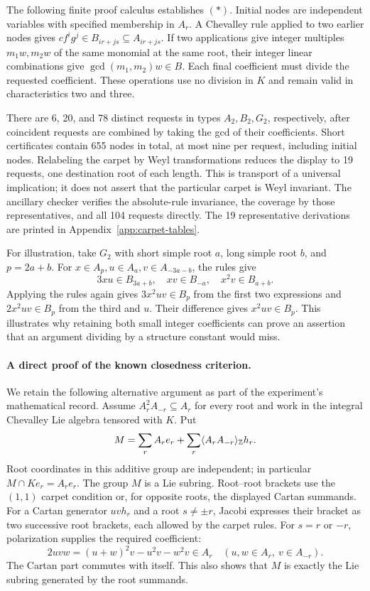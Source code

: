 The following finite proof calculus establishes \((\ast)\).
Initial nodes are independent variables with specified membership
in \(A_r\). A Chevalley rule applied to two earlier nodes gives
\(c f^i g^j\in B_{ir+js}\subseteq A_{ir+js}\).
If two applications give integer multiples \(m_1w,m_2w\) of the
same monomial at the same root, their integer linear combinations
give \(\gcd(m_1,m_2)w\in B\). Each final coefficient must divide
the requested coefficient. These operations use no division in \(K\)
and remain valid in characteristics two and three.

There are 6, 20, and 78 distinct requests in types \(A_2,B_2,G_2\),
respectively, after coincident requests are combined by taking the
gcd of their coefficients. Short certificates contain 655 nodes in
total, at most nine per request, including initial nodes. Relabeling
the carpet by Weyl transformations reduces the display to 19 requests,
one destination root of each length. This is transport of a universal
implication; it does not assert that the particular carpet is Weyl
invariant. The ancillary checker verifies the absolute-rule invariance,
the coverage by those representatives, and all 104 requests directly.
The 19 representative derivations are printed in
Appendix~\ref{app:carpet-tables}.

For illustration, take \(G_2\) with short simple root \(a\), long
simple root \(b\), and \(p=2a+b\). For
\(x\in A_p,u\in A_a,v\in A_{-3a-b}\), the rules give
\[
 3xu\in B_{3a+b},\quad xv\in B_{-a},\quad
 x^2v\in B_{a+b}.
\]
Applying the rules again gives \(3x^2uv\in B_p\) from the first
two expressions and \(2x^2uv\in B_p\) from the third and \(u\).
Their difference gives \(x^2uv\in B_p\). This illustrates why
retaining both small integer coefficients can prove an assertion
that an argument dividing by a structure constant would miss.

\paragraph{A direct proof of the known closedness criterion.}
\label{prior:19.63}
We retain the following alternative argument as part of the
experiment's mathematical record. Assume \(A_r^2A_{-r}\subseteq A_r\)
for every root and work in the integral Chevalley Lie algebra tensored
with \(K\). Put
\[
 M=\sum_r A_re_r+
       \sum_r\langle A_rA_{-r}\rangle_{\mathbb Z}h_r.
\]
Root coordinates in this additive group are independent; in particular
\(M\cap Ke_r=A_re_r\). The group \(M\) is a Lie subring.
Root--root brackets use the \((1,1)\) carpet condition or, for
opposite roots, the displayed Cartan summands. For a Cartan generator
\(uvh_r\) and a root \(s\ne\pm r\), Jacobi expresses their bracket
as two successive root brackets, each allowed by the carpet rules.
For \(s=r\) or \(-r\), polarization supplies the required coefficient:
\[
 2uvw=(u+w)^2v-u^2v-w^2v\in A_r
 \quad (u,w\in A_r,\ v\in A_{-r}).
\]
The Cartan part commutes with itself. This also shows that \(M\)
is exactly the Lie subring generated by the root summands.

